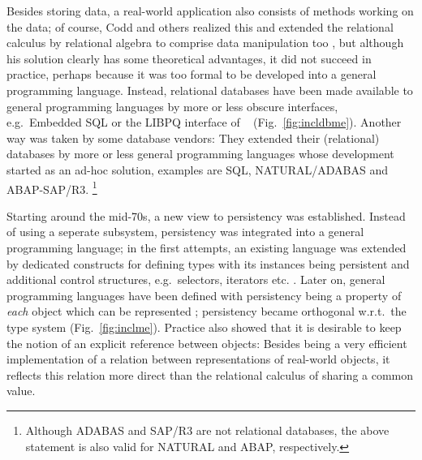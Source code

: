 \documentclass[a4paper%
]{article}
\newcommand\showfigrule{0pt}
\renewcommand\figurename{Fig.}
\begin{document}
\begin{figwindow}[2,r,{\rule{\showfigrule}{4\baselineskip}
                       \fbox{\psfig{figure=tenpt/incldbme.eps}}},%
                  {Modelling a real system%
                   {$^{\ref{fn:fig}}$}\label{fig:incldbme}}]
%
\addtocounter{footnote}{1}%
%
Besides storing data, a real-world application also consists of
methods working on the data; of course, Codd and others realized this
and extended the relational calculus by relational algebra to comprise
data manipulation too \cite[]{bib:co79}
\cite[]{bib:on94}, but although his solution clearly has
some theoretical advantages, it did not succeed in practice, perhaps
because it was too formal to be developed into a general programming
language. Instead, relational databases have been made available to
general programming languages by more or less obscure interfaces,
e.g.\ Embedded SQL
\cite[]{bib:on94} or the LIBPQ interface of
\postgres\ \cite[]{bib:we93}
(\figurename~\ref{fig:incldbme}). Another way was taken
by some database vendors: They extended their (relational) databases
by more or less general programming languages whose development
started as an ad-hoc solution, examples are SQL, NATURAL/ADABAS and
ABAP-SAP/R3.%
\footnote{Although ADABAS and SAP/R3 are not
relational databases, the above statement is also valid for
NATURAL and ABAP, respectively.}
\end{figwindow}%
%
\begin{figwindow}[2,r,{\rule{\showfigrule}{2\baselineskip}%
                       \fbox{\psfig{figure=tenpt/inclme.eps}}},%
                 {Modelling a real system%
                  {$^{\ref{fn:fig}}$}\label{fig:inclme}}]
%
Starting around the mid-70s, a new view to persistency was
established. Instead of using a seperate subsystem, persistency was
integrated into a general programming language; in the first attempts,
an existing language was extended by dedicated constructs for defining
types with its instances being persistent and additional control
structures, e.g.\ selectors, iterators etc. \cite{bib:schm80}. Later
on, general programming languages have been defined with persistency
being a property of \emph{each} object which can be represented
\cite{bib:cl91,bib:ma93}; persistency became orthogonal w.r.t.\ the
type system (\figurename~\ref{fig:inclme}). Practice also showed that
it is desirable to keep the notion of an explicit reference between
objects: Besides being a very efficient implementation of a relation
between representations of real-world objects, it reflects this
relation more direct than the relational calculus of sharing a common
value.
\end{figwindow}%
%
\end{document}
